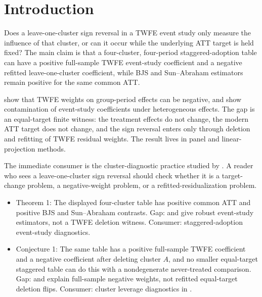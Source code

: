 \documentclass[11pt]{article}
\theoremstyle{definition}
\theoremstyle{plain}
\theoremstyle{remark}
\begin{document}
\section{Introduction}
Does a leave-one-cluster sign reversal in a TWFE event study only measure the influence of that cluster, or can it occur while the underlying ATT target is held fixed?  The main claim is that a four-cluster, four-period staggered-adoption table can have a positive full-sample TWFE event-study coefficient and a negative refitted leave-one-cluster coefficient, while BJS and Sun--Abraham estimators remain positive for the same common ATT.

\citet[\S3, pp. 265--270]{dechaisemartin_dhaultfoeuille_2020_aer} show that TWFE weights on group-period effects can be negative, and \citet[\S2--\S3, pp. 254--260]{sun_abraham_2021_joe} show contamination of event-study coefficients under heterogeneous effects.  The gap is an equal-target finite witness: the treatment effects do not change, the modern ATT target does not change, and the sign reversal enters only through deletion and refitting of TWFE residual weights.  The result lives in panel and linear-projection methods.

The immediate consumer is the cluster-diagnostic practice studied by \citet[\S3--\S5]{mackinnon_nielsen_webb_2023_stata}.  A reader who sees a leave-one-cluster sign reversal should check whether it is a target-change problem, a negative-weight problem, or a refitted-residualization problem.

\begin{itemize}[leftmargin=*]
\item Theorem 1: The displayed four-cluster table has positive common ATT and positive BJS and Sun--Abraham contrasts. Gap: \citet{borusyak_jaravel_spiess_2024_restud} and \citet{sun_abraham_2021_joe} give robust event-study estimators, not a TWFE deletion witness. Consumer: staggered-adoption event-study diagnostics.
\item Conjecture 1: The same table has a positive full-sample TWFE coefficient and a negative coefficient after deleting cluster \(A\), and no smaller equal-target staggered table can do this with a nondegenerate never-treated comparison. Gap: \citet{dechaisemartin_dhaultfoeuille_2020_aer} and \citet{goodman_bacon_2021_joe} explain full-sample negative weights, not refitted equal-target deletion flips. Consumer: cluster leverage diagnostics in \citet{mackinnon_nielsen_webb_2023_stata}.
\end{itemize}
\end{document}
